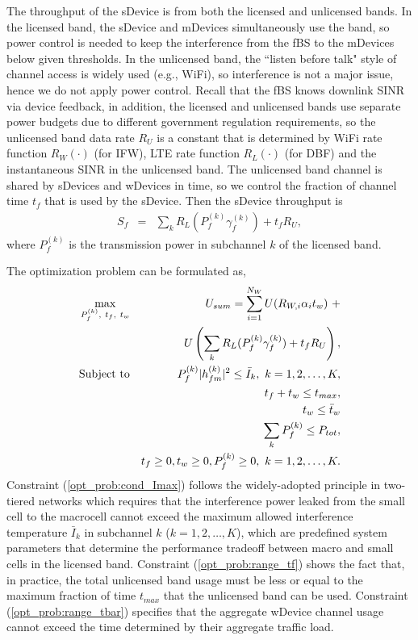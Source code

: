 \documentclass[journal,final,letterpaper,10pt,doublecolumn,twoside]{IEEEtran}
\begin{document}
The  throughput of the  sDevice  is from both the licensed and unlicensed bands. In the licensed band,  the sDevice and mDevices simultaneously use the band, so power control is needed to keep the interference from the fBS to the mDevices below given thresholds. In the unlicensed band, the ``listen before talk" style of channel access is widely used (e.g., WiFi), so interference is not a major issue, hence we do not apply power control.  Recall that the fBS knows downlink SINR via device feedback, in addition, the licensed and unlicensed bands use separate power budgets due to different government regulation requirements, so the unlicensed band data rate $R_U$  is a constant that is determined by WiFi rate function $R_W(\cdot)$ (for IFW), LTE rate function $R_L(\cdot)$ (for DBF) and
 the instantaneous SINR in the unlicensed band. The unlicensed band channel is shared by sDevices and wDevices in time, so we control the fraction of channel time $t_f$ that is used by the sDevice. Then the sDevice throughput is
\begin{eqnarray}
S_f &=& \sum_k R_L(P_f^{(k)} \gamma_f^{(k)}) + t_f R_U  , \label{eq:R_f}
\end{eqnarray}
where $P_f^{(k)}$ is the transmission power in subchannel $k$ of the
licensed band.







The optimization problem can be formulated as,
\begin{eqnarray}
\max_{P_f^{(k)}, ~ t_f, ~t_w} &&
U_{sum} = \sum_{i=1}^{N_W} U( R_{W,i}\alpha_i  t_w  )  ~ +  \nonumber  \\
&& U \left (\sum_k R_L(P_f^{(k)} \gamma_f^{(k)}) + t_f R_U \right ),  \label{opt_prob:obj}\\
\textmd{Subject to} && P_f^{(k)} |h_{fm}^{(k)}|^2  \leq \bar{I}_k, ~ k = 1, 2, \dots, K , \label{opt_prob:cond_Imax} \\
&& t_f + t_w \leq  t_{max} , \label{opt_prob:range_tf} \\
&& t_w \leq \bar{t}_w  \label{opt_prob:range_tbar} \\
&& \sum_{k} P_f^{(k)} \leq P_{tot} , \label{opt_prob:cond_Ptot} \\
&& t_f \geq 0, t_w \geq 0,   P_f^{(k)} \geq 0, ~ k = 1, 2, \dots, K
. \nonumber \\  \label{opt_prob:range_Pf}
\end{eqnarray}
Constraint (\ref{opt_prob:cond_Imax}) follows the widely-adopted
principle \cite{femto-PowerControl-2010Sundeep} in two-tiered
networks which requires that the interference power leaked from the
small cell to the macrocell cannot exceed the maximum allowed
interference temperature  $\bar{I}_k$ in subchannel $k$ ($k = 1, 2,
\dots, K$), which are predefined system parameters that determine
the performance tradeoff between macro and small cells in the
licensed band. Constraint (\ref{opt_prob:range_tf}) shows the fact
that, in practice, the total unlicensed band usage must be less or
equal to the maximum fraction of time $t_{max}$ that the unlicensed
band can be used.  Constraint
(\ref{opt_prob:range_tbar}) specifies that the aggregate wDevice channel usage cannot
exceed the time determined by their aggregate traffic load.
\end{document}
